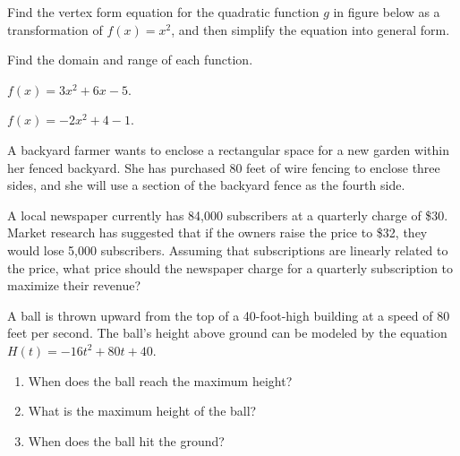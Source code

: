 \begin{example}
 Find the vertex form equation for the quadratic function $g$ in figure below as a transformation of $f(x)=x^2$, and then simplify the equation into general form.

\end{example}
\vspace*{-0.2\textheight}

\begin{example}
  Find the domain and range of each function.\\
  \begin{enumerate*}
    \item $f(x)=3x^2+6x-5$.
    \item $f(x)=-2x^2+4-1$.\hfill\null
  \end{enumerate*}
\end{example}

\begin{example}
  A backyard farmer wants to enclose a rectangular space for a new garden within her fenced backyard. She has purchased 80 feet of wire fencing to enclose three sides, and she will use a section of the backyard fence as the fourth side.
\end{example}

\newpage

\begin{example}
  A local newspaper currently has 84,000 subscribers at a quarterly charge of \$30. Market research has suggested that if the owners raise the price to \$32, they would lose 5,000 subscribers. Assuming that subscriptions are linearly related to the price, what price should the newspaper charge for a quarterly subscription to maximize their revenue?
\end{example}

\begin{example}
  A ball is thrown upward from the top of a 40-foot-high building at a speed of 80 feet per second. The ball's height above ground can be modeled by the equation \(H(t)=-16t^2+80t+40\).
\begin{enumerate}
  \item When does the ball reach the maximum height?
  \item What is the maximum height of the ball?  
  \item When does the ball hit the ground?
\end{enumerate}
\end{example}

